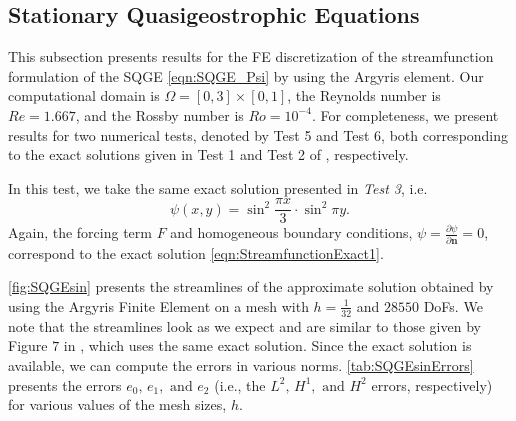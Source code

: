 \subsection{Stationary Quasigeostrophic Equations}\label{sse:SQGE}
This subsection presents results for the FE discretization of the streamfunction formulation of the
SQGE \eqref{eqn:SQGE_Psi} by using the Argyris element. Our computational domain is
$\Omega=[0,3]\times[0,1]$, the Reynolds number is $Re=1.667$, and the Rossby number is $Ro=10^{-4}$.
For completeness, we present results for two numerical tests, denoted by Test 5 and Test 6, both
corresponding to the exact solutions given in Test 1 and Test 2 of \cite{Cascon}, respectively.

In this test, we take the same exact solution presented in \emph{Test 3}, i.e.
\begin{equation}
  \psi(x,y) = \sin^2 \frac{\pi x}{3} \cdot \sin^2 \pi y.
  \label{eqn:StreamfunctionExact1}
\end{equation}
Again, the forcing term $F$ and homogeneous boundary conditions, $\psi = \frac{\partial
\psi}{\partial \mathbf{n}} = 0$, correspond to the exact solution \eqref{eqn:StreamfunctionExact1}.

\autoref{fig:SQGEsin} presents the streamlines of the approximate solution obtained by using the
Argyris Finite Element on a mesh with $h=\frac{1}{32}$ and $28550$ DoFs. We note that the
streamlines look as we expect and are similar to those given by Figure $7$ in \cite{Myers}, which
uses the same exact solution.  Since the exact solution is available, we can compute the errors in
various norms. \autoref{tab:SQGEsinErrors} presents the errors $e_0,\, e_1, \text{ and } e_2$ (i.e.,
the $L^2,\, H^1, \text{ and } H^2$ errors, respectively) for various values of the mesh sizes, $h$.

